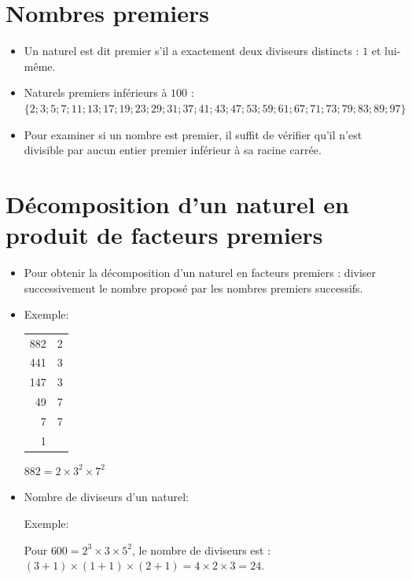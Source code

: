 \documentclass[11pt,a4paper,x11names,usenames,dvipsnames,svgnames,oneside]{ctexbook}
\begin{document}
	\section{ Nombres premiers }
	\begin{df}%
		\begin{itemize}
			\item Un naturel est dit premier s'il a exactement deux diviseurs distincts : $1$ et lui-même. 
			\item Naturels premiers inférieurs à $100$ : \\
			$\{2;3 ;5 ;7 ;11 ;13 ;17 ;19 ;23 ;29 ;31 ;37 ;41 ;43 ;47 ;53 ;59 ;61 ;67 ;71 ;73 ;79 ;83 ;89 ;97\}$ 
			\item Pour  examiner  si  un  nombre est  premier,  il suffit  de vérifier qu'il  n'est divisible par aucun entier premier inférieur à sa racine carrée. 
		\end{itemize}
	\end{df}
	\section{ Décomposition d'un naturel en produit de facteurs premiers}
	\begin{pr}%
		\begin{itemize}
			\item Pour obtenir la décomposition d'un naturel en facteurs premiers : diviser successivement le nombre proposé par les nombres premiers successifs. 
			\item Exemple:
			\begin{center}
				\begin{tabular}{r|l}
					882&2\\
					441&3\\
					147&3\\
					49&7\\
					7&7\\
					1&\\
				\end{tabular}
				\qquad\qquad $882 = 2 \times 3^2 \times 7^2$ 
			\end{center}
			\item Nombre de diviseurs d'un naturel:
			
			Exemple:  
			
			Pour $600=2^3\times 3\times 5^2$, le nombre de diviseurs est :
			$(3+1)\times (1+1)\times (2+1)=4\times 2\times 3 = 24$.
		\end{itemize}
	\end{pr}
\end{document}
